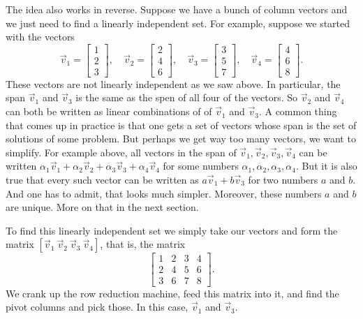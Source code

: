 The idea also works in reverse.  Suppose we have a bunch of column vectors
and we just need to find a linearly independent set.  For example, suppose
we started with the vectors
\begin{equation*}
\vec{v}_1 =
\begin{bmatrix}
1 \\
2 \\
3 
\end{bmatrix}
,
\quad
\vec{v}_2 =
\begin{bmatrix}
2 \\
4 \\
6
\end{bmatrix}
,
\quad
\vec{v}_3 =
\begin{bmatrix}
3 \\
5 \\
7
\end{bmatrix}
,
\quad
\vec{v}_4 =
\begin{bmatrix}
4 \\
6 \\
8
\end{bmatrix} .
\end{equation*}
These vectors are not linearly independent as we saw above.  In particular,
the span $\vec{v}_1$ and $\vec{v}_3$ is the same as
the spen of all four of the vectors.  So $\vec{v}_2$ and $\vec{v}_4$
can both be written as linear combinations of of $\vec{v}_1$ and $\vec{v}_3$.
A common thing that comes up in practice is that one gets a set of vectors
whose span is the set of solutions of some problem.  But perhaps we get way
too many vectors, we want to simplify.  For example above, all vectors in
the span of
$\vec{v}_1, \vec{v}_2, \vec{v}_3, \vec{v}_4$ can be written
$\alpha_1 \vec{v}_1 + \alpha_2 \vec{v}_2 + \alpha_3 \vec{v}_3 + \alpha_4
\vec{v}_4$ for some numbers $\alpha_1,\alpha_2,\alpha_3,\alpha_4$.  But
it is also true that every such vector can be written as
$a \vec{v}_1 + b \vec{v}_3$ for two numbers $a$ and $b$.  And one has to
admit, that looks much simpler.  Moreover, these numbers $a$ and $b$ are
unique.  More on that in the next section.

To find this linearly independent set we simply take our vectors
and form the matrix $[ \vec{v}_1 ~ \vec{v}_2 ~ \vec{v}_3 ~ \vec{v}_4 ]$,
that is, the matrix
\begin{equation*}
\begin{bmatrix}
1 & 2 & 3 & 4 \\
2 & 4 & 5 & 6 \\
3 & 6 & 7 & 8
\end{bmatrix} .
\end{equation*}
We crank up the row reduction machine, feed this matrix into it, and find
the pivot columns and pick those.  In this case, $\vec{v}_1$ and
$\vec{v}_3$.

